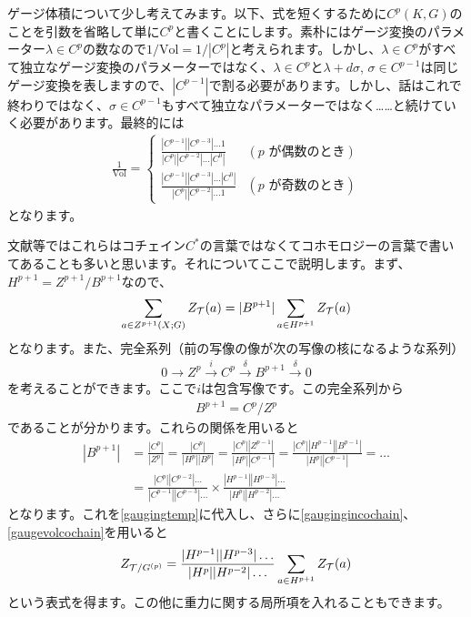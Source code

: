 \documentclass[generalized_symmetry.tex]{subfiles}
\begin{document}
ゲージ体積について少し考えてみます。以下、式を短くするために$C^p(K,G)$のことを引数を省略して単に$C^p$と書くことにします。素朴にはゲージ変換のパラメーター$\lambda \in C^{p}$の数なので$1/\mathrm{Vol} = 1/|C^p|$と考えられます。しかし、$\lambda \in C^p$がすべて独立なゲージ変換のパラメーターではなく、$\lambda\in C^p$と$\lambda+d\sigma$, $\sigma \in C^{p-1}$は同じゲージ変換を表しますので、$|C^{p-1}|$で割る必要があります。しかし、話はこれで終わりではなく、$\sigma \in C^{p-1}$もすべて独立なパラメーターではなく……と続けていく必要があります。最終的には
\begin{align}
  \frac{1}{\mathrm{Vol}} =
  \begin{cases}
    \frac{|C^{p-1}||C^{p-3}|\dots 1}{|C^p||C^{p-2}|\dots |C^0|}  & (p \text{ が偶数のとき}) \\
    \frac{|C^{p-1}||C^{p-3}|\dots |C^0|}{|C^p||C^{p-2}|\dots 1}  & (p \text{ が奇数のとき})  
  \end{cases}
  \label{gaugevolcochain}
\end{align}
となります。

文献等ではこれらはコチェイン$C^*$の言葉ではなくてコホモロジーの言葉で書いてあることも多いと思います。それについてここで説明します。まず、$H^{p+1}=Z^{p+1}/B^{p+1}$なので、
\begin{align}
  \sum_{a \in Z^{p+1}(X;G)} Z_{\mathcal{T}}(a)=|B^{p+1}|\sum_{a \in H^{p+1}} Z_{\mathcal{T}}(a)\label{gaugingtemp}
\end{align}
となります。また、完全系列（前の写像の像が次の写像の核になるような系列）
\begin{align}
  0 \to Z^{p} \overset{i}{\to} C^{p} \overset{\delta}{\to} B^{p+1} \overset{\delta}{\to} 0 
\end{align}
を考えることができます。ここで$i$は包含写像です。この完全系列から
\begin{align}
  B^{p+1}=C^{p}/Z^{p}
\end{align}
であることが分かります。これらの関係を用いると
\begin{align}
  |B^{p+1}|&=\frac{|C^{p}|}{|Z^{p}|}
  =\frac{|C^{p}|}{|H^p||B^p|}=\frac{|C^{p}||Z^{p-1}|}{|H^p||C^{p-1}|}
  =\frac{|C^{p}||H^{p-1}||B^{p-1}|}{|H^p||C^{p-1}|}
  =\dots\\
  &=\frac{|C^{p}||C^{p-2}|\dots }{|C^{p-1}||C^{p-3}|\dots}\times
  \frac{|H^{p-1}||H^{p-3}|\dots }{|H^p||H^{p-2}|\dots } 
\end{align}
となります。これを\eqref{gaugingtemp}に代入し、さらに\eqref{gaugingincochain}、\eqref{gaugevolcochain}を用いると
\begin{align}
  Z_{\mathcal{T}/G^{(p)}} = \frac{|H^{p-1}||H^{p-3}|\dots }{|H^p||H^{p-2}|\dots } \sum_{a \in H^{p+1}} Z_{\mathcal{T}}(a)
\end{align}
という表式を得ます。この他に重力に関する局所項を入れることもできます。
\end{document}
